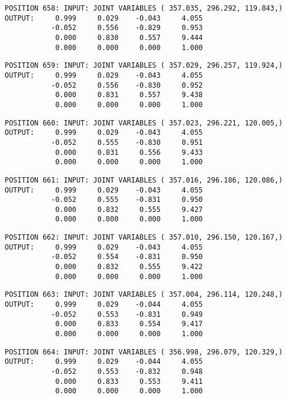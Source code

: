 \begin{verbatim}
POSITION 658: INPUT: JOINT VARIABLES ( 357.035, 296.292, 119.843,)
OUTPUT:     0.999     0.029    -0.043     4.055
           -0.052     0.556    -0.829     0.953
            0.000     0.830     0.557     9.444
            0.000     0.000     0.000     1.000
\end{verbatim} \pagebreak[1]\begin{verbatim}
POSITION 659: INPUT: JOINT VARIABLES ( 357.029, 296.257, 119.924,)
OUTPUT:     0.999     0.029    -0.043     4.055
           -0.052     0.556    -0.830     0.952
            0.000     0.831     0.557     9.438
            0.000     0.000     0.000     1.000
\end{verbatim} \pagebreak[1]\begin{verbatim}
POSITION 660: INPUT: JOINT VARIABLES ( 357.023, 296.221, 120.005,)
OUTPUT:     0.999     0.029    -0.043     4.055
           -0.052     0.555    -0.830     0.951
            0.000     0.831     0.556     9.433
            0.000     0.000     0.000     1.000
\end{verbatim} \pagebreak[1]\begin{verbatim}
POSITION 661: INPUT: JOINT VARIABLES ( 357.016, 296.186, 120.086,)
OUTPUT:     0.999     0.029    -0.043     4.055
           -0.052     0.555    -0.831     0.950
            0.000     0.832     0.555     9.427
            0.000     0.000     0.000     1.000
\end{verbatim} \pagebreak[1]\begin{verbatim}
POSITION 662: INPUT: JOINT VARIABLES ( 357.010, 296.150, 120.167,)
OUTPUT:     0.999     0.029    -0.043     4.055
           -0.052     0.554    -0.831     0.950
            0.000     0.832     0.555     9.422
            0.000     0.000     0.000     1.000
\end{verbatim} \pagebreak[1]\begin{verbatim}
POSITION 663: INPUT: JOINT VARIABLES ( 357.004, 296.114, 120.248,)
OUTPUT:     0.999     0.029    -0.044     4.055
           -0.052     0.553    -0.831     0.949
            0.000     0.833     0.554     9.417
            0.000     0.000     0.000     1.000
\end{verbatim} \pagebreak[1]\begin{verbatim}
POSITION 664: INPUT: JOINT VARIABLES ( 356.998, 296.079, 120.329,)
OUTPUT:     0.999     0.029    -0.044     4.055
           -0.052     0.553    -0.832     0.948
            0.000     0.833     0.553     9.411
            0.000     0.000     0.000     1.000
\end{verbatim} \pagebreak[1]\begin{verbatim}

\end{verbatim}
